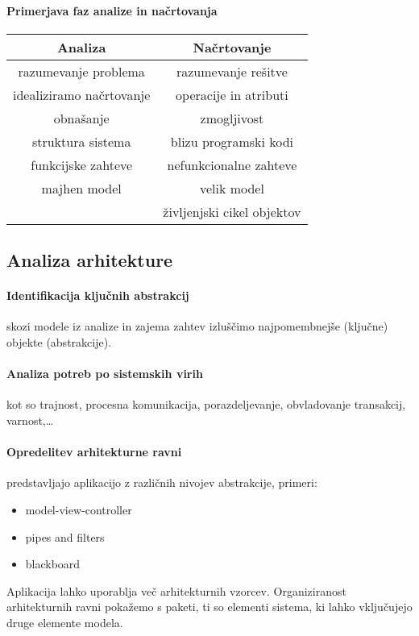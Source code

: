 \documentclass[a4paper,12pt]{report}
\begin{document}
      \paragraph{Primerjava faz analize in načrtovanja}
      \begin{center}
         \begin{tabular}{|c|c|}
            \hline
            \textbf{Analiza} & \textbf{Načrtovanje} \\
            \hline
            razumevanje problema & razumevanje rešitve\\
            idealiziramo načrtovanje & operacije in atributi\\
            obnašanje & zmogljivost\\
            struktura sistema & blizu programski kodi\\
            funkcijske zahteve & nefunkcionalne zahteve\\
            majhen model & velik model \\
            & življenjski cikel objektov\\
            \hline
         \end{tabular}
      \end{center}

   \subsection{Analiza arhitekture}
   \paragraph{Identifikacija ključnih abstrakcij} skozi modele iz analize in zajema zahtev izluščimo najpomembnejše (ključne) objekte (abstrakcije).

   \paragraph{Analiza potreb po sistemskih virih} kot so trajnost, procesna komunikacija, porazdeljevanje, obvladovanje transakcij, varnost,\dots

   \paragraph{Opredelitev arhitekturne ravni} predstavljajo aplikacijo z različnih nivojev abstrakcije, primeri:
      \begin{itemize}
         \item model-view-controller
         \item pipes and filters
         \item blackboard
      \end{itemize}
   Aplikacija lahko uporablja več arhitekturnih vzorcev. Organiziranost arhitekturnih ravni pokažemo s paketi, ti so
   elementi sistema, ki lahko vključujejo druge elemente modela.
\end{document}
